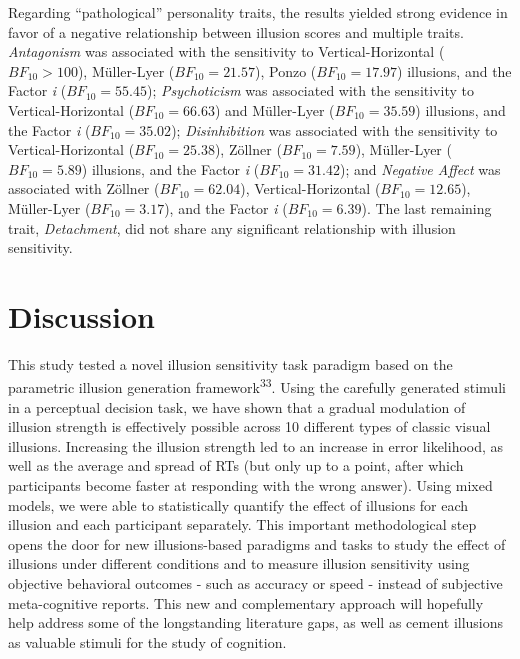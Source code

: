\documentclass[
  man,floatsintext]{apa6}
\begin{document}
Regarding ``pathological'' personality traits, the results yielded strong evidence in favor of a negative relationship between illusion scores and multiple traits. \emph{Antagonism} was associated with the sensitivity to Vertical-Horizontal (\(BF_{10} > 100\)), Müller-Lyer (\(BF_{10} = 21.57\)), Ponzo (\(BF_{10} = 17.97\)) illusions, and the Factor \emph{i} (\(BF_{10} = 55.45\)); \emph{Psychoticism} was associated with the sensitivity to Vertical-Horizontal (\(BF_{10} = 66.63\)) and Müller-Lyer (\(BF_{10} = 35.59\)) illusions, and the Factor \emph{i} (\(BF_{10} = 35.02\)); \emph{Disinhibition} was associated with the sensitivity to Vertical-Horizontal (\(BF_{10} = 25.38\)), Zöllner (\(BF_{10} = 7.59\)), Müller-Lyer (\(BF_{10} = 5.89\)) illusions, and the Factor \emph{i} (\(BF_{10} = 31.42\)); and \emph{Negative Affect} was associated with Zöllner (\(BF_{10} = 62.04\)), Vertical-Horizontal (\(BF_{10} = 12.65\)), Müller-Lyer (\(BF_{10} = 3.17\)), and the Factor \emph{i} (\(BF_{10} = 6.39\)). The last remaining trait, \emph{Detachment}, did not share any significant relationship with illusion sensitivity.

\hypertarget{discussion}{%
\section{Discussion}\label{discussion}}

This study tested a novel illusion sensitivity task paradigm based on the parametric illusion generation framework\textsuperscript{33}. Using the carefully generated stimuli in a perceptual decision task, we have shown that a gradual modulation of illusion strength is effectively possible across 10 different types of classic visual illusions. Increasing the illusion strength led to an increase in error likelihood, as well as the average and spread of RTs (but only up to a point, after which participants become faster at responding with the wrong answer). Using mixed models, we were able to statistically quantify the effect of illusions for each illusion and each participant separately. This important methodological step opens the door for new illusions-based paradigms and tasks to study the effect of illusions under different conditions and to measure illusion sensitivity using objective behavioral outcomes - such as accuracy or speed - instead of subjective meta-cognitive reports. This new and complementary approach will hopefully help address some of the longstanding literature gaps, as well as cement illusions as valuable stimuli for the study of cognition.
\end{document}
